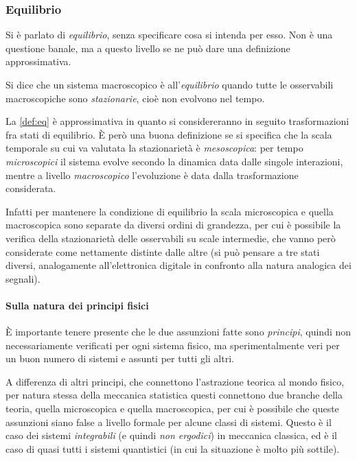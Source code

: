 \subsubsection{Equilibrio}

Si è parlato di \textit{equilibrio}, senza specificare cosa si intenda per esso. Non è una questione banale, ma a questo livello se ne può dare una definizione approssimativa.

\begin{defn}[Equilibrio]
	\label{def:eq}
	Si dice che un sistema macroscopico è all'\textit{equilibrio} quando tutte le osservabili macroscopiche sono \textit{stazionarie}, cioè non evolvono nel tempo.
\end{defn}

La \cref{def:eq} è approssimativa in quanto si considereranno in seguito trasformazioni fra stati di equilibrio.
\`E però una buona definizione se si specifica che la scala temporale su cui va valutata la stazionarietà è \textit{mesoscopica}: per tempo \textit{microscopici} il sistema evolve secondo la dinamica data dalle singole interazioni, mentre a livello \textit{macroscopico} l'evoluzione è data dalla trasformazione considerata.

Infatti per mantenere la condizione di equilibrio la scala microscopica e quella macroscopica sono separate da diversi ordini di grandezza, per cui è possibile la verifica della stazionarietà delle osservabili su scale intermedie, che vanno però considerate come nettamente distinte dalle altre (si può pensare a tre stati diversi, analogamente all'elettronica digitale in confronto alla natura analogica dei segnali).

\paragraph{Sulla natura dei principi fisici} \`E importante tenere presente che le due assunzioni fatte sono \textit{principi}, quindi non necessariamente verificati per ogni sistema fisico, ma sperimentalmente veri per un buon numero di sistemi e assunti per tutti gli altri.

A differenza di altri principi, che connettono l'astrazione teorica al mondo fisico, per natura stessa della meccanica statistica questi connettono due branche della teoria, quella microscopica e quella macroscopica, per cui è possibile che queste assunzioni siano false a livello formale per alcune classi di sistemi. Questo è il caso dei sistemi \textit{integrabili} (e quindi \textit{non ergodici}) in meccanica classica, ed è il caso di quasi tutti i sistemi quantistici (in cui la situazione è molto più sottile).

